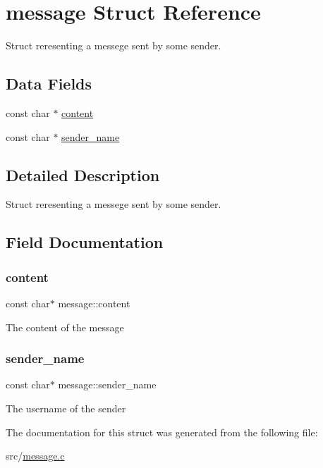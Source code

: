 \hypertarget{structmessage}{}\section{message Struct Reference}
\label{structmessage}


Struct reresenting a messege sent by some sender.  


\subsection*{Data Fields}
\begin{DoxyCompactItemize}
\item 
const char $\ast$ \hyperlink{structmessage_ad3b965525fe62cb25162084d97a3f0ff}{content}
\item 
const char $\ast$ \hyperlink{structmessage_a93d4525b657c15744e45ca9504840000}{sender\+\_\+name}
\end{DoxyCompactItemize}


\subsection{Detailed Description}
Struct reresenting a messege sent by some sender. 

\subsection{Field Documentation}
\mbox{\label{structmessage_ad3b965525fe62cb25162084d97a3f0ff}} 
\subsubsection{\texorpdfstring{content}{content}}
{\footnotesize\ttfamily const char$\ast$ message\+::content}

The content of the message \mbox{\label{structmessage_a93d4525b657c15744e45ca9504840000}} 
\subsubsection{\texorpdfstring{sender\+\_\+name}{sender\_name}}
{\footnotesize\ttfamily const char$\ast$ message\+::sender\+\_\+name}

The username of the sender 

The documentation for this struct was generated from the following file\+:\begin{DoxyCompactItemize}
\item 
src/\hyperlink{message_8c}{message.\+c}\end{DoxyCompactItemize}
